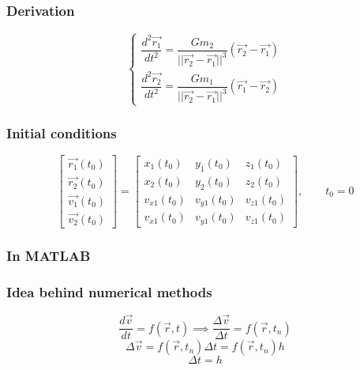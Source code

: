 \documentclass[english,12pt,a4paper]{beamer}
\begin{document}
	\begin{frame}
		\frametitle{Derivation}
		\begin{equation}
			\begin{cases}
				\dfrac{d^2\vec{r_1}}{dt^2} =  \dfrac{G m_2}{||\vec{r_2} - \vec{r_1}||^3} (\vec{r_2} - \vec{r_1})\\
				\dfrac{d^2\vec{r_2}}{dt^2} =  \dfrac{G m_1}{||\vec{r_2} - \vec{r_1}||^3} (\vec{r_1} - \vec{r_2})
			\end{cases}
		\end{equation}	
	\end{frame}
	
	\begin{frame}
		\frametitle{Initial conditions}
			\begin{equation}
			\begin{bmatrix}
				\vec{r_1}(t_0) \\ \vec{r_2}(t_0) \\ \vec{v_1}(t_0) \\ \vec{v_2}(t_0)
			\end{bmatrix}
			=
			\begin{bmatrix}
				x_1(t_0) & y_1(t_0) & z_1(t_0)\\
				x_2(t_0) & y_2(t_0) & z_2(t_0)\\
				v_{x1}(t_0) & v_{y1}(t_0) & v_{z1}(t_0)\\
				v_{x1}(t_0) & v_{y1}(t_0) & v_{z1}(t_0)
			\end{bmatrix}
			, \qquad t_0 = 0
		\end{equation}
	\end{frame}
	
	\begin{frame}
		\frametitle{In MATLAB}
		
	\end{frame}
	
	\begin{frame}
		\frametitle{Idea behind numerical methods}
		\begin{equation}\label{eq:num}
			\frac{d \vec{v}}{dt} = f(\vec{r}, t) \implies \frac{\Delta \vec{v}}{\Delta t} = f(\vec{r}, t_n)
		\end{equation}
		\begin{equation}
			\Delta \vec{v} = f(\vec{r}, t_n) \Delta t = f(\vec{r}, t_n) h
		\end{equation}
		$$
			\Delta t = h
		$$
	\end{frame}
	
\end{document}
